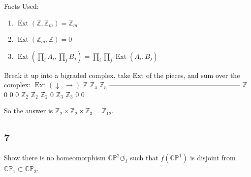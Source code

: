 \begin{solution}

Facts Used:

\begin{enumerate}
\def\labelenumi{\arabic{enumi}.}
\tightlist
\item
  \(\operatorname{Ext} ({\mathbb{Z}}, {\mathbb{Z}}_m) = {\mathbb{Z}}_m\)
\item
  \(\operatorname{Ext} ({\mathbb{Z}}_m, {\mathbb{Z}}) = 0\)
\item
  \(\operatorname{Ext} (\prod_i A_i, \prod_j B_j) = \prod_i \prod_j \operatorname{Ext} (A_i, B_j)\)
\end{enumerate}

Break it up into a bigraded complex, take Ext of the pieces, and sum
over the complex: \(\operatorname{Ext} (\downarrow, \rightarrow)\)
\textbar{} \({\mathbb{Z}}\) \textbar{} \({\mathbb{Z}}_4\) \textbar{}
\({\mathbb{Z}}_5\)
--------------------------------\textbar---------\textbar---------\textbar--------
\({\mathbb{Z}}\) \textbar{} 0 \textbar{} 0 \textbar{} 0
\({\mathbb{Z}}_2\) \textbar{} \({\mathbb{Z}}_2\) \textbar{}
\({\mathbb{Z}}_2\) \textbar{} 0 \({\mathbb{Z}}_3\) \textbar{}
\({\mathbb{Z}}_3\) \textbar{} 0 \textbar{} 0

So the answer is
\({\mathbb{Z}}_2 \times {\mathbb{Z}}_2 \times {\mathbb{Z}}_3 = {\mathbb{Z}}_{12}\).

\end{solution}

\hypertarget{section-11}{%
\subsection{7}\label{section-11}}

Show there is no homeomorphism \({\mathbb{CP}}^2{\circlearrowleft}_f\)
such that \(f({\mathbb{CP}}^1)\) is disjoint from
\({\mathbb{CP}}_1 \subset {\mathbb{CP}}_2\).

